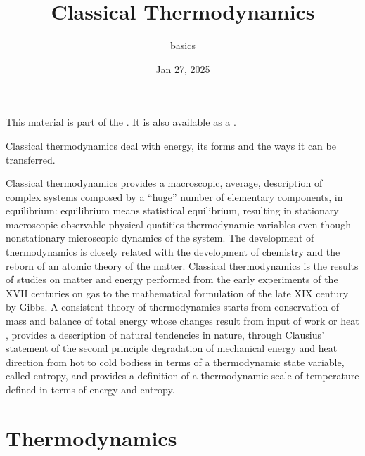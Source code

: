 \documentclass[letterpaper,10pt,english]{jupyterBook}
\title{Classical Thermodynamics}
\date{Jan 27, 2025}
\author{basics}
\begin{document}
\pagestyle{empty}
\sphinxmaketitle
\pagestyle{plain}
\sphinxtableofcontents
\pagestyle{normal}
\label{\detokenize{intro::doc}}


\sphinxAtStartPar
This material is part of the . It is also available as a .

\sphinxAtStartPar
Classical thermodynamics deal with energy, its forms and the ways it can be transferred.

\sphinxAtStartPar
Classical thermodynamics provides a macroscopic, average, description of complex systems composed by a “huge” number of elementary components, in equilibrium: equilibrium means statistical equilibrium, resulting in stationary macroscopic observable physical quatities \sphinxhyphen{} thermodynamic variables \sphinxhyphen{} even though non\sphinxhyphen{}stationary microscopic dynamics of the system. The development of thermodynamics is closely related with the development of chemistry and the re\sphinxhyphen{}born of an atomic theory of the matter. Classical thermodynamics is the results of studies on matter and energy performed from the early experiments of the XVII centuries on gas to the mathematical formulation of the late XIX century by Gibbs. A consistent theory of thermodynamics starts from conservation of mass and balance of total energy \sphinxhyphen{} whose changes result from input of work or heat \sphinxhyphen{}, provides a description of natural tendencies in nature, through Clausius’ statement of the second principle \sphinxhyphen{} degradation of mechanical energy and heat direction from hot to cold bodiess \sphinxhyphen{} in terms of a thermodynamic state variable, called entropy, and provides a definition of a thermodynamic scale of temperature \sphinxhyphen{} defined in terms of energy and entropy.



\sphinxstepscope


\part{Thermodynamics}

\sphinxstepscope
\end{document}
